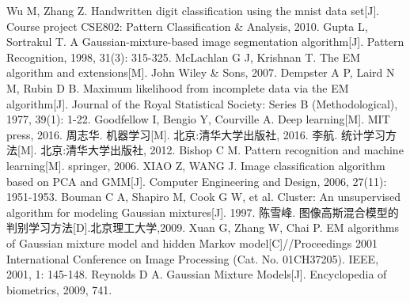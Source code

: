 \documentclass[UTF8]{ctexart}
\begin{document}
\begin{thebibliography}{99}
	Wu M, Zhang Z. Handwritten digit classification using the mnist data set[J]. Course project CSE802: Pattern Classification \& Analysis, 2010.
	Gupta L, Sortrakul T. A Gaussian-mixture-based image segmentation algorithm[J]. Pattern Recognition, 1998, 31(3): 315-325.
	McLachlan G J, Krishnan T. The EM algorithm and extensions[M]. John Wiley \& Sons, 2007. 
	Dempster A P, Laird N M, Rubin D B. Maximum likelihood from incomplete data via the EM algorithm[J]. Journal of the Royal Statistical Society: Series B (Methodological), 1977, 39(1): 1-22. 
	Goodfellow I, Bengio Y, Courville A. Deep learning[M]. MIT press, 2016.
	周志华. 机器学习[M]. 北京:清华大学出版社, 2016.
	李航. 统计学习方法[M]. 北京:清华大学出版社, 2012.
	Bishop C M. Pattern recognition and machine learning[M]. springer, 2006.
	XIAO Z, WANG J. Image classification algorithm based on PCA and GMM[J]. Computer Engineering and Design, 2006, 27(11): 1951-1953.
	Bouman C A, Shapiro M, Cook G W, et al. Cluster: An unsupervised algorithm for modeling Gaussian mixtures[J]. 1997.
	陈雪峰. 图像高斯混合模型的判别学习方法[D].北京理工大学,2009.
	Xuan G, Zhang W, Chai P. EM algorithms of Gaussian mixture model and hidden Markov model[C]//Proceedings 2001 International Conference on Image Processing (Cat. No. 01CH37205). IEEE, 2001, 1: 145-148.
	Reynolds D A. Gaussian Mixture Models[J]. Encyclopedia of biometrics, 2009, 741.


\end{thebibliography}
\end{document}
